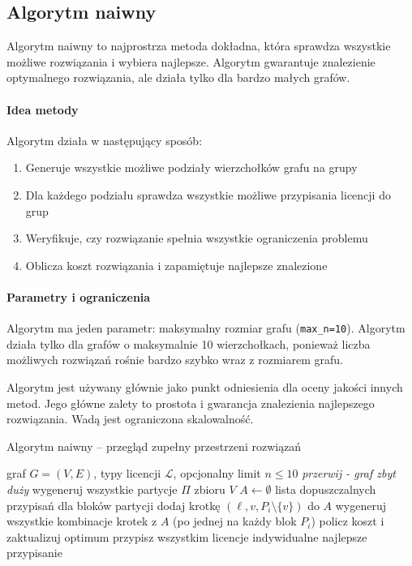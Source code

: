 \subsection{Algorytm naiwny}

Algorytm naiwny to najprostrza metoda dokładna, która sprawdza wszystkie możliwe rozwiązania i wybiera najlepsze. Algorytm gwarantuje znalezienie optymalnego rozwiązania, ale działa tylko dla bardzo małych grafów.

\paragraph{Idea metody}
Algorytm działa w następujący sposób:
\begin{enumerate}
  \item Generuje wszystkie możliwe podziały wierzchołków grafu na grupy
  \item Dla każdego podziału sprawdza wszystkie możliwe przypisania licencji do grup
  \item Weryfikuje, czy rozwiązanie spełnia wszystkie ograniczenia problemu
  \item Oblicza koszt rozwiązania i zapamiętuje najlepsze znalezione
\end{enumerate}

\paragraph{Parametry i ograniczenia}
Algorytm ma jeden parametr: maksymalny rozmiar grafu (\texttt{max\_n=10}). Algorytm działa tylko dla grafów o maksymalnie 10 wierzchołkach, ponieważ liczba możliwych rozwiązań rośnie bardzo szybko wraz z rozmiarem grafu.

Algorytm jest używany głównie jako punkt odniesienia dla oceny jakości innych metod. Jego główne zalety to prostota i gwarancja znalezienia najlepszego rozwiązania. Wadą jest ograniczona skalowalność.


\begin{algorithm}[H]
\caption{Algorytm naiwny -- przegląd zupełny przestrzeni rozwiązań}
\label{alg:naive}
\begin{algorithmic}[1]
\Require graf \(G=(V,E)\), typy licencji \(\mathcal{L}\), opcjonalny limit \(n\le 10\)
 \State \Return \textit{przerwij - graf zbyt duży} \EndIf
\State wygeneruj wszystkie partycje \(\Pi\) zbioru \(V\)
  \State \(A\gets\emptyset\) \Comment lista dopuszczalnych przypisań dla bloków partycji
        \State dodaj krotkę \((\ell, v, P_i\setminus\{v\})\) do \(A\)
      \EndIf
    \EndFor
  \EndFor
  \State wygeneruj wszystkie kombinacje krotek z \(A\) (po jednej na każdy blok \(P_i\))
     \State policz koszt i zaktualizuj optimum \EndIf
  \EndFor
\EndFor
{} \State przypisz wszystkim licencje indywidualne \EndIf
\State \Return najlepsze przypisanie
\end{algorithmic}
\end{algorithm}

